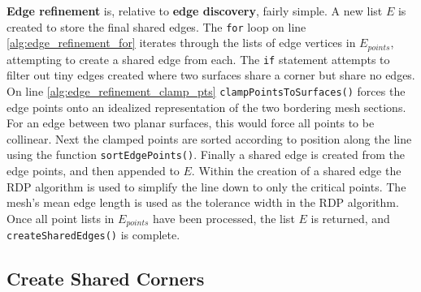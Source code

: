 \textbf{Edge refinement} is, relative to \textbf{edge discovery}, fairly simple.
A new list $E$ is created to store the final shared edges.
The \verb|for| loop on line \ref{alg:edge_refinement_for} iterates through the lists of edge vertices in $E_{points}$, attempting to create a shared edge from each.
The \verb|if| statement attempts to filter out tiny edges created where two surfaces share a corner but share no edges.
On line \ref{alg:edge_refinement_clamp_pts} \verb|clampPointsToSurfaces()| forces the edge points onto an idealized representation of the two bordering mesh sections.
For an edge between two planar surfaces, this would force all points to be collinear.
Next the clamped points are sorted according to position along the line using the function \verb|sortEdgePoints()|.
Finally a shared edge is created from the edge points, and then appended to $E$.
Within the creation of a shared edge the RDP algorithm is used to simplify the line down to only the critical points.
The mesh's mean edge length is used as the tolerance width in the RDP algorithm.
Once all point lists in $E_{points}$ have been processed, the list $E$ is returned, and \verb|createSharedEdges()| is complete.

\subsection{Create Shared Corners}

